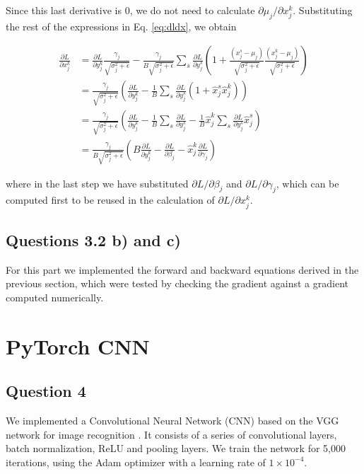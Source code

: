 \documentclass{article}
\newcommand{\pd}[2]{\frac{\partial #1}{\partial #2}}
\begin{document}
Since this last derivative is 0, we do not need to calculate $\partial\mu_j/\partial x_j^k$. Substituting the rest of the expressions in Eq. \ref{eq:dldx}, we obtain

\begin{align*}
\pd{L}{x_j^k} &= \pd{L}{y_j^k}\frac{\gamma_j}{\sqrt{\sigma_j^2 + \epsilon}} -\frac{\gamma_j}{B\sqrt{\sigma_j^2 + \epsilon}}\sum_s \pd{L}{y_j^s}\left(1 + \frac{(x_j^s - \mu_j)}{\sqrt{\sigma_j^2 + \epsilon}}\frac{(x_j^k - \mu_j)}{\sqrt{\sigma_j^2 + \epsilon}}  \right) \\
&=
\frac{\gamma_j}{\sqrt{\sigma_j^2 + \epsilon}}\left(\pd{L}{y_j^k} - \frac{1}{B}\sum_s \pd{L}{y_j^s} (1 + \hat{x}_j^s \hat{x}_j^k) \right) \\
&=
\frac{\gamma_j}{\sqrt{\sigma_j^2 + \epsilon}}\left(\pd{L}{y_j^k} - \frac{1}{B}\sum_s \pd{L}{y_j^s} - \frac{1}{B}\hat{x}_j^k\sum_s \pd{L}{y_j^s}\hat{x}_j^s \right) \\
&=
\frac{\gamma_j}{B\sqrt{\sigma_j^2 + \epsilon}}\left(B\pd{L}{y_j^k} - \pd{L}{\beta_j} - \hat{x}_j^k \pd{L}{\gamma_j} \right)
\end{align*}

where in the last step we have substituted $\partial L/\partial\beta_j$ and $\partial L/\partial\gamma_j$, which can be computed first to be reused in the calculation of $\partial L/\partial x_j^k$.

\subsection*{Questions 3.2 b) and c)}

For this part we implemented the forward and backward equations derived in the previous section, which were tested by checking the gradient against a gradient computed numerically.

\section{PyTorch CNN}

\subsection*{Question 4}

We implemented a Convolutional Neural Network (CNN) based on the VGG network for image recognition \cite{simonyan2014vgg}. It consists of a series of convolutional layers, batch normalization, ReLU and pooling layers. We train the network for 5,000 iterations, using the Adam optimizer with a learning rate of $1\times 10^{-4}$.
\end{document}
